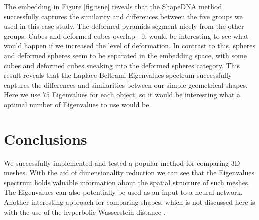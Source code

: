 \documentclass[11pt]{article}
\begin{document}
The embedding in Figure \ref{fig:tsne} reveals that the ShapeDNA method successfully captures the similarity and differences between the five groups we used in this case study. The deformed pyramids segment nicely from the other groups. Cubes and deformed cubes overlap - it would be interesting to see what would happen if we increased the level of deformation. In contrast to this, spheres and deformed spheres seem to be separated in the embedding space, with some cubes and deformed cubes sneaking into the deformed spheres category. This result reveals that the Laplace-Beltrami Eigenvalues spectrum successfully captures the differences and similarities between our simple geometrical shapes. Here we use $75$ Eigenvalues for each object, so it would be interesting what a optimal number of Eigenvalues to use would be.

\section{Conclusions}
We successfully implemented and tested a popular method for comparing 3D meshes. With the aid of dimensionality reduction we can see that the Eigenvalues spectrum holds valuable information about the spatial structure of such meshes. The Eigenvalues can also potentially be used as an input to a neural network. Another interesting approach for comparing shapes, which is not discussed here is with the use of the hyperbolic Wasserstein distance \cite{hyp_w}. 

\printbibliography
\end{document}
